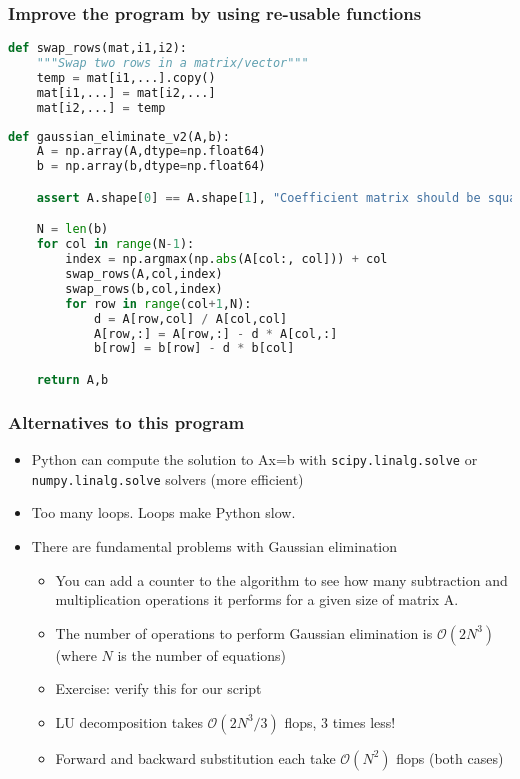 \begin{frame}[fragile]
  \frametitle{Improve the program by using re-usable functions}
  \begin{lstlisting}[language=Python]
def swap_rows(mat,i1,i2):
    """Swap two rows in a matrix/vector"""
    temp = mat[i1,...].copy()
    mat[i1,...] = mat[i2,...]
    mat[i2,...] = temp
  \end{lstlisting}
  \begin{lstlisting}[language=Python]
def gaussian_eliminate_v2(A,b):
    A = np.array(A,dtype=np.float64)
    b = np.array(b,dtype=np.float64)

    assert A.shape[0] == A.shape[1], "Coefficient matrix should be square"

    N = len(b)
    for col in range(N-1):
        index = np.argmax(np.abs(A[col:, col])) + col
        swap_rows(A,col,index)
        swap_rows(b,col,index)
        for row in range(col+1,N):
            d = A[row,col] / A[col,col]
            A[row,:] = A[row,:] - d * A[col,:]
            b[row] = b[row] - d * b[col]

    return A,b
  \end{lstlisting}
\end{frame}

\begin{frame}[fragile]
  \frametitle{Alternatives to this program}
  \begin{itemize}
    \item Python can compute the solution to Ax=b with \lstinline|scipy.linalg.solve| or \lstinline|numpy.linalg.solve| solvers (more efficient)
    \item Too many loops. Loops make Python slow.
    \item There are fundamental problems with Gaussian elimination\pause
    \begin{itemize}
      \item You can add a counter to the algorithm to see how many subtraction and multiplication operations it performs for a given size of matrix A.
      \item The number of operations to perform Gaussian elimination is $\mathcal{O}(2N^3)$ (where $N$ is the number of equations) 
      \item Exercise: verify this for our script \pause
      \item LU decomposition takes $\mathcal{O}(2N^3/3)$ flops, 3 times less!
      \item Forward and backward substitution each take $\mathcal{O}(N^2)$
flops (both cases) 
    \end{itemize}
  \end{itemize}
\end{frame}

